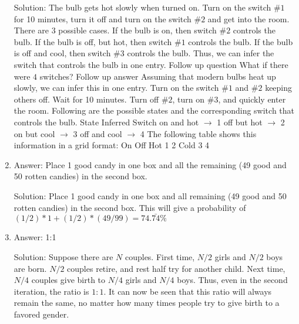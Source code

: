 \begin{enumerate}
Solution: The bulb gets hot slowly when turned on. Turn on the switch \#$1$ for 10 minutes, turn it off and turn on the switch \#$2$ and get into the room. There are $3$ possible cases.
If the bulb is on, then switch \#$2$ controls the bulb.
If the bulb is off, but hot, then switch \#$1$ controls the bulb.
If the bulb is off and cool, then switch \#$3$ controls the bulb.
Thus, we can infer the switch that controls the bulb in one entry.
Follow up question
What if there were $4$ switches?
Follow up answer
Assuming that modern bulbs heat up slowly, we can infer this in one entry.
Turn on the switch \#$1$ and \#$2$ keeping others off. Wait for 10 minutes. Turn off \#$2$, turn on \#$3$, and quickly enter the room. Following are the possible states and the corresponding switch that controls the bulb.
State
Inferred Switch
on and hot
$\rightarrow$
1
off but hot
$\rightarrow$
2
on but cool
$\rightarrow$
3
off and cool
$\rightarrow$
4
The following table shows this information in a grid format:
On
Off
Hot
1
2
Cold
3
4




\item
Answer: Place 1 good candy in one box and all the remaining (49 good and 50 rotten candies) in the second box.
 
Solution: Place 1 good candy in one box and all remaining (49 good and 50 rotten candies) in the second box.
This will give a probability of $(1/2) * 1 + (1/2) * (49/99) = 74.\bar{74}\%$




\item
Answer: 1:1
 
Solution: Suppose there are $N$ couples. First time, $N/2$ girls and $N/2$ boys are born. $N/2$ couples retire, and rest half try for another child.
Next time, $N/4$ couples give birth to $N/4$ girls and $N/4$ boys. Thus, even in the second iteration, the ratio is $1:1$. It can now be seen that this ratio will always remain the same, no matter how many times people try to give birth to a favored gender.




\end{enumerate}
